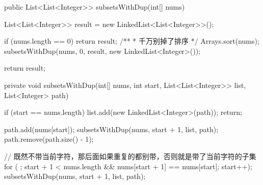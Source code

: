 \begin{Code}
public List<List<Integer>> subsetsWithDup(int[] nums) {
    List<List<Integer>> result = new LinkedList<List<Integer>>();

    if (nums.length == 0) {
        return result;
    }
    /**
     * 千万别掉了排序
     */
    Arrays.sort(nums);
    subsetsWithDup(nums, 0, result, new LinkedList<Integer>());

    return result;
}

private void subsetsWithDup(int[] nums, int start, List<List<Integer>> list, List<Integer> path) {
    if (start == nums.length) {
        list.add(new LinkedList<Integer>(path));
        return;
    }

    path.add(nums[start]);
    subsetsWithDup(nums, start + 1, list, path);
    path.remove(path.size() - 1);

    // 既然不带当前字符，那后面如果重复的都别带，否则就是带了当前字符的子集
    for ( ; start + 1 < nums.length && nums[start + 1] == nums[start]; start++);
    subsetsWithDup(nums, start + 1, list, path);
}
\end{Code}
